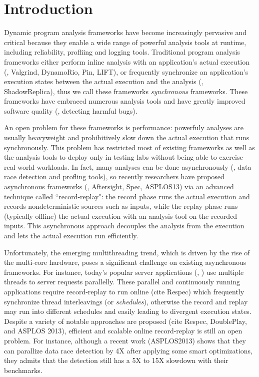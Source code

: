 \section{Introduction} \label{sec:intro}



Dynamic program analysis frameworks have become increasingly pervasive and 
critical because they enable a wide range of powerful analysis tools at 
runtime, including reliability, profliing and logging tools. 
Traditional program analysis frameworks either perform inline analysis with an 
application's actual execution (\eg, Valgrind, DynamoRio, Pin, LIFT), or 
frequently synchronize an application's execution states between the actual 
execution and the analysis (\eg, ShadowReplica), thus we call these frameworks 
\emph{synchronous} frameworks. These frameworks have embraced numerous analysis 
tools and have greatly improved software quality (\eg, detecting harmful bugs).


An open problem for these frameworks is performance: powerfuly analyses are 
usually heavyweight and prohibitively slow down the actual execution that 
runs synchronously. This problem has restricted most of existing frameworks as 
well as the analysis tools to deploy only in testing labs without being able 
to exercise real-world workloads. In fact, many analyses can be done 
asynchronously (\eg, data race detection and profling tools), so recently 
researchers have proposed asynchronous frameworks (\eg, Aftersight, Spec, 
ASPLOS13) via an advanced technique called ``record-replay": the record 
phase runs the actual execution and records nondeterministic sources such as 
inputs, while the replay phase runs (typically offline) the actual execution 
with an analysis tool on the recorded inputs. This asynchronous approach 
decouples the analysis from the execution and lets the actual execution run 
efficiently.


Unfortunately, the emerging multithreading trend, which is driven by the rise 
of the multi-core hardware, poses a significant challenge on existing 
asynchronous frameworks. For instance, today's popular server applications 
(\eg, \apache) use multiple threads to server requests parallelly. These 
parallel and continuously running applications require record-replay to run 
online (cite Respec) which frequently synchronize thread interleavings (or 
\emph{schedules}), otherwise the record and replay may run into different 
schedules and easily leading to divergent execution states. Despite a variety 
of notable approaches are proposed (cite Respec, DoublePlay, and ASPLOS 2013), 
efficient and scalable online record-replay is still an open problem. For 
instance, although a recent work (ASPLOS2013) shows that they can parallize 
data race detection by 4X after applying some smart optimizations, they admits 
that the detection still has a 5X to 15X slowdown with their benchmarks.


